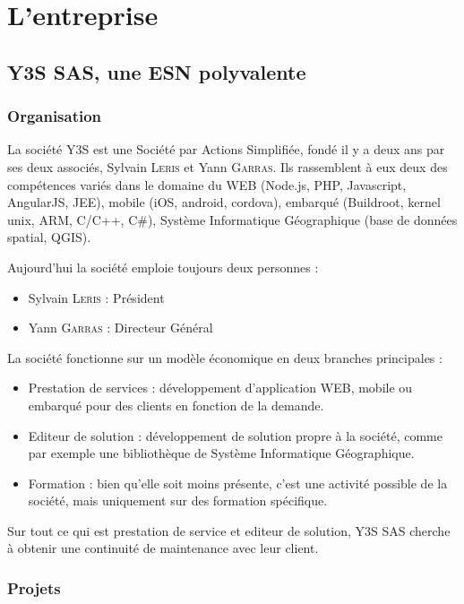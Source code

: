 \chapter{L'entreprise}
\label{chap:y3s}

\section{Y3S SAS, une ESN polyvalente}

\subsection{Organisation}
La société Y3S est une Société par Actions Simplifiée, fondé il y a deux ans par ses deux associés, Sylvain \textsc{Leris} et Yann \textsc{Garras}. Ils rassemblent à eux deux des compétences variés dans le domaine du WEB (Node.js, PHP, Javascript, AngularJS, JEE), mobile (iOS, android, cordova), embarqué (Buildroot, kernel unix, ARM, C/C++, C\#), Système Informatique Géographique (base de données spatial, QGIS).


Aujourd'hui la société emploie toujours deux personnes :
\begin{itemize}
    \item Sylvain \textsc{Leris} : Président
    \item Yann \textsc{Garras} : Directeur Général
\end{itemize}

La société fonctionne sur un modèle économique en deux branches principales :
\begin{itemize}
    \item Prestation de services : développement d'application WEB, mobile ou embarqué pour des clients en fonction de la demande.
    \item Editeur de solution : développement de solution propre à la société, comme par exemple une bibliothèque de Système Informatique Géographique.
    \item Formation : bien qu'elle soit moins présente, c'est une activité possible de la société, mais uniquement sur des formation spécifique. 
\end{itemize}

Sur tout ce qui est prestation de service et editeur de solution, Y3S SAS cherche à obtenir une continuité de maintenance avec leur client.

\subsection{Projets}

